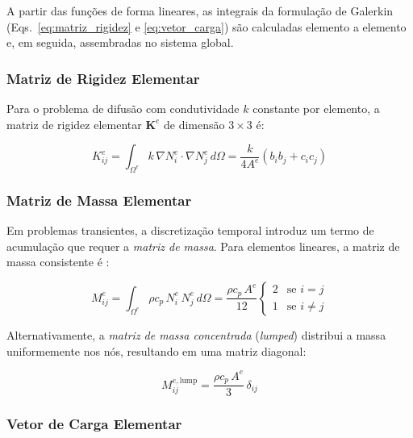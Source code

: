 A partir das funções de forma lineares, as integrais da formulação de Galerkin (Eqs.~\ref{eq:matriz_rigidez} e \ref{eq:vetor_carga}) são calculadas elemento a elemento e, em seguida, assembradas no sistema global.

\subsubsection{Matriz de Rigidez Elementar}

Para o problema de difusão com condutividade $k$ constante por elemento, a matriz de rigidez elementar $\mathbf{K}^e$ de dimensão $3 \times 3$ é:

\begin{equation}
K_{ij}^e = \int_{\Omega^e} k \, \nabla N_i^e \cdot \nabla N_j^e \, d\Omega = \frac{k}{4A^e} (b_i b_j + c_i c_j)
\label{eq:rigidez_elementar}
\end{equation}

\subsubsection{Matriz de Massa Elementar}

Em problemas transientes, a discretização temporal introduz um termo de acumulação que requer a \textit{matriz de massa}. Para elementos lineares, a matriz de massa consistente é \cite{Zienkiewicz2013}:

\begin{equation}
M_{ij}^e = \int_{\Omega^e} \rho c_p \, N_i^e \, N_j^e \, d\Omega = \frac{\rho c_p \, A^e}{12}
\begin{cases}
2 & \text{se } i = j \\
1 & \text{se } i \neq j
\end{cases}
\label{eq:massa_elementar}
\end{equation}

Alternativamente, a \textit{matriz de massa concentrada} (\textit{lumped}) distribui a massa uniformemente nos nós, resultando em uma matriz diagonal:

\begin{equation}
M_{ij}^{e,\text{lump}} = \frac{\rho c_p \, A^e}{3} \, \delta_{ij}
\label{eq:massa_lumped}
\end{equation}

\subsubsection{Vetor de Carga Elementar}

